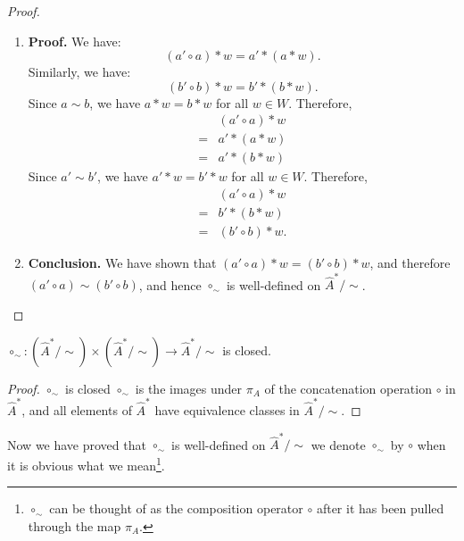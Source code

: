 \begin{proof}
\begin{enumerate}[(1)]
		\item \textbf{Proof.}
		      We have:
		      \begin{equation}
			      (a' \circ a) \ast w = a' \ast (a \ast w).
		      \end{equation}
		      Similarly, we have:
		      \begin{equation}
			      (b' \circ b) \ast w = b' \ast (b \ast w).
		      \end{equation}
		      Since $a \sim b$, we have $a \ast w = b \ast w$ for all $w \in W$.
		      Therefore,
		      \begin{align}
			          & (a' \circ a) \ast w \\
			      ={} & a' \ast (a \ast w)  \\
			      ={} & a' \ast (b \ast w)
		      \end{align}
		      Since $a' \sim b'$, we have $a' \ast w = b' \ast w$ for all $w \in W$.
		      Therefore,
		      \begin{align}
			          & (a' \circ a) \ast w  \\
			      ={} & b' \ast (b \ast w)   \\
			      ={} & (b' \circ b) \ast w.
		      \end{align}


		\item \textbf{Conclusion.}
		      We have shown that $(a' \circ a) \ast w = (b' \circ b) \ast w$, and therefore $(a' \circ a) \sim (b' \circ b)$, and hence $\circ_{\sim}$ is well-defined on $\hat{A}^{\ast}/\sim$.
	\end{enumerate}

\end{proof}

\begin{proposition}\label{prp:circ_sim_closed}
	$\circ_{\sim}: (\hat{A}^{\ast}/\sim) \times (\hat{A}^{\ast}/\sim) \to \hat{A}^{\ast}/\sim$ is closed.
\end{proposition}
\begin{proof}
	$\circ_{\sim}$ is closed $\circ_{\sim}$ is the images under $\pi_{A}$ of the concatenation operation $\circ$ in $\hat{A}^{\ast}$, and all elements of $\hat{A}^{\ast}$ have equivalence classes in $\hat{A}^{\ast}/\sim$.
\end{proof}


Now we have proved that $\circ_{\sim}$ is well-defined on $\hat{A}^{\ast}/\sim$ we denote $\circ_{\sim}$ by $\circ$ when it is obvious what we mean\footnote{$\circ_{\sim}$ can be thought of as the composition operator $\circ$ after it has been pulled through the map $\pi_{A}$.}.

